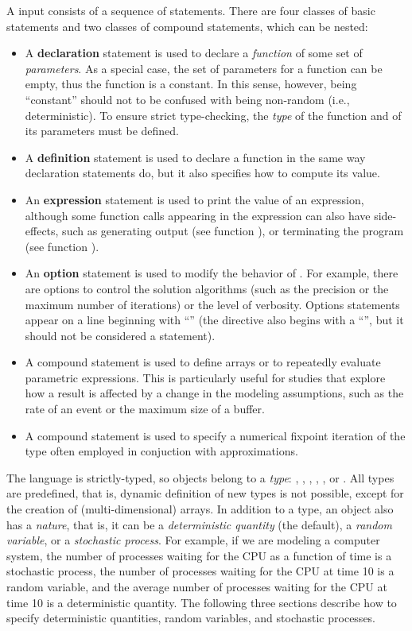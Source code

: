 A {\smart} input consists of a sequence of statements.
There are four classes of basic statements and two classes of
compound statements, which can be nested:
\begin{itemize}
\item
A {\bf {}declaration} statement
is used to declare a \emph{function} of some set of \emph{parameters}.
As a special case, the set of parameters for a function can be empty,
thus the function is a constant.
In this sense, however, being ``constant'' should not to be confused with
being non-random (i.e., deterministic).
To ensure strict type-checking, the \emph{type} of the function and of
its parameters must be defined.  
\item
A {\bf {}definition} statement is used to
declare a function in the same
way declaration statements do, but it also specifies how to compute its value.
\item
An {\bf expression} statement is used to print the value of an expression,
although some function calls appearing in the expression
can also have side-effects,
such as generating output (see function ),
or terminating the program (see function ).

\item
An {\bf option} statement is used to modify the behavior of {\smart}.
For example, there are options to control the solution algorithms (such
as the precision or the maximum number of iterations) or the level
of verbosity.
Options statements appear on a line beginning with ``\Code{\#}''
(the  directive also begins with a ``\Code{\#}'', but it
should not be considered a statement).

\item
A  compound statement is used to define arrays or to
repeatedly evaluate parametric expressions.
This is particularly useful for studies that explore how a result is
affected by a change in the modeling assumptions, such as the rate of
an event or the maximum size of a buffer.
\item
A  compound statement is used to specify a numerical fixpoint
iteration of the type often employed in conjuction with approximations.
\end{itemize}


The {\smart} language is strictly-typed, so objects belong to a \emph{type}:
,
,
,
,
, or
.
All types are predefined, that is, dynamic definition of new types is not
possible, except for the creation of (multi-dimensional) arrays.
In addition to a type, an object also has a \emph{nature}, that is, it can
be a \emph{deterministic quantity} (the default),
a \emph{random variable}, or a \emph{stochastic process}.
For example, if we are modeling a computer system,
the number of processes waiting for the CPU as a function of time
is a stochastic process,
the number of processes waiting for the CPU at time 10 is a random
variable, and the average number of processes waiting for the CPU at time 10
is a deterministic quantity.
The following three sections describe how to specify deterministic quantities,
random variables, and stochastic processes.

